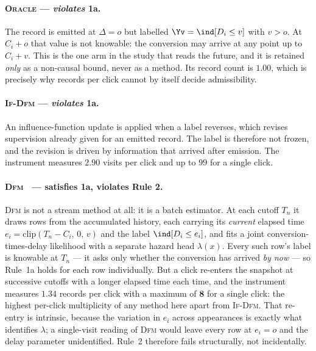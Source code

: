 \paragraph{\textsc{Oracle} --- \emph{violates} 1a.} The record is emitted at $\Delta=o$ but
labelled $\Yv=\ind[D_i\le v]$ with $v>o$. At $C_i+o$ that value is not knowable: the conversion may
arrive at any point up to $C_i+v$. This is the one arm in the study that reads the future, and it
is retained \emph{only} as a non-causal bound, never as a method. Its record count is $1.00$, which
is precisely why records per click cannot by itself decide admissibility.

\paragraph{\textsc{If-Dfm} --- \emph{violates} 1a.} An influence-function update is applied when a
label reverses, which revises supervision already given for an emitted record. The label is
therefore not frozen, and the revision is driven by information that arrived after emission. The
instrument measures $2.90$ visits per click and up to $99$ for a single click.

\paragraph{\textsc{Dfm}~\cite{chapelle2014modeling} --- satisfies 1a, violates Rule 2.}
\textsc{Dfm} is not a stream method at all: it is a batch estimator. At each cutoff $T_n$ it draws
rows from the accumulated history, each carrying its \emph{current} elapsed time
$e_i = \mathrm{clip}(T_n - C_i,\, 0,\, v)$ and the label $\ind[D_i \le e_i]$, and fits a joint
conversion-times-delay likelihood with a separate hazard head $\lambda(x)$. Every such row's label
is knowable at $T_n$ --- it asks only whether the conversion has arrived \emph{by now} --- so
Rule~1a holds for each row individually. But a click re-enters the snapshot at successive cutoffs
with a longer elapsed time each time, and the instrument measures $1.34$ records per click with a
maximum of $\mathbf{8}$ for a single click: the highest per-click multiplicity of any method here
apart from \textsc{If-Dfm}. That re-entry is intrinsic, because the variation in $e_i$ across
appearances is exactly what identifies $\lambda$; a single-visit reading of \textsc{Dfm} would
leave every row at $e_i = o$ and the delay parameter unidentified. Rule~2 therefore fails
structurally, not incidentally.

